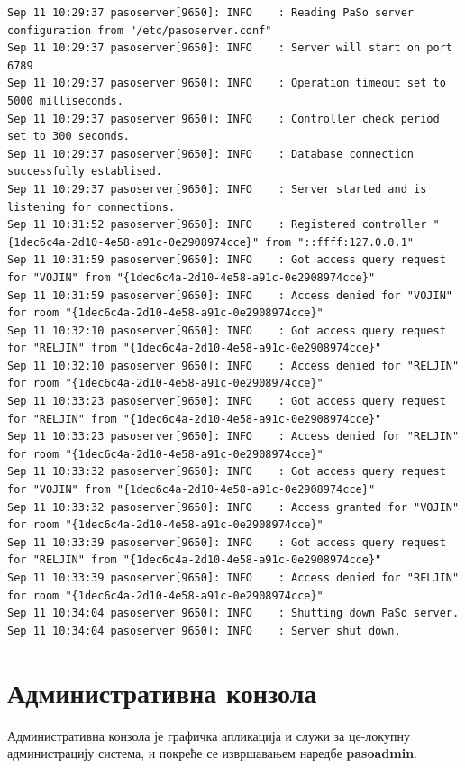 \documentclass[a4paper, 12pt, diplomski]{etfcyr}
\begin{document}
\begin{justify}
\begin{tiny}
\begin{verbatim}
Sep 11 10:29:37 pasoserver[9650]: INFO    : Reading PaSo server configuration from "/etc/pasoserver.conf"
Sep 11 10:29:37 pasoserver[9650]: INFO    : Server will start on port 6789
Sep 11 10:29:37 pasoserver[9650]: INFO    : Operation timeout set to 5000 milliseconds.
Sep 11 10:29:37 pasoserver[9650]: INFO    : Controller check period set to 300 seconds.
Sep 11 10:29:37 pasoserver[9650]: INFO    : Database connection successfully establised.
Sep 11 10:29:37 pasoserver[9650]: INFO    : Server started and is listening for connections.
Sep 11 10:31:52 pasoserver[9650]: INFO    : Registered controller "{1dec6c4a-2d10-4e58-a91c-0e2908974cce}" from "::ffff:127.0.0.1"
Sep 11 10:31:59 pasoserver[9650]: INFO    : Got access query request for "VOJIN" from "{1dec6c4a-2d10-4e58-a91c-0e2908974cce}"
Sep 11 10:31:59 pasoserver[9650]: INFO    : Access denied for "VOJIN" for room "{1dec6c4a-2d10-4e58-a91c-0e2908974cce}"
Sep 11 10:32:10 pasoserver[9650]: INFO    : Got access query request for "RELJIN" from "{1dec6c4a-2d10-4e58-a91c-0e2908974cce}"
Sep 11 10:32:10 pasoserver[9650]: INFO    : Access denied for "RELJIN" for room "{1dec6c4a-2d10-4e58-a91c-0e2908974cce}"
Sep 11 10:33:23 pasoserver[9650]: INFO    : Got access query request for "RELJIN" from "{1dec6c4a-2d10-4e58-a91c-0e2908974cce}"
Sep 11 10:33:23 pasoserver[9650]: INFO    : Access denied for "RELJIN" for room "{1dec6c4a-2d10-4e58-a91c-0e2908974cce}"
Sep 11 10:33:32 pasoserver[9650]: INFO    : Got access query request for "VOJIN" from "{1dec6c4a-2d10-4e58-a91c-0e2908974cce}"
Sep 11 10:33:32 pasoserver[9650]: INFO    : Access granted for "VOJIN" for room "{1dec6c4a-2d10-4e58-a91c-0e2908974cce}"
Sep 11 10:33:39 pasoserver[9650]: INFO    : Got access query request for "RELJIN" from "{1dec6c4a-2d10-4e58-a91c-0e2908974cce}"
Sep 11 10:33:39 pasoserver[9650]: INFO    : Access denied for "RELJIN" for room "{1dec6c4a-2d10-4e58-a91c-0e2908974cce}"
Sep 11 10:34:04 pasoserver[9650]: INFO    : Shutting down PaSo server.
Sep 11 10:34:04 pasoserver[9650]: INFO    : Server shut down.
					\end{verbatim}
				\end{tiny}

			\end{justify}
			
		\section{Административна конзола}
			\begin{justify}
				Административна конзола је графичка апликација и служи за це-локупну администрацију система, и покреће се извршавањем наредбе \textbf{pasoadmin}.
			\end{justify}
\end{document}
